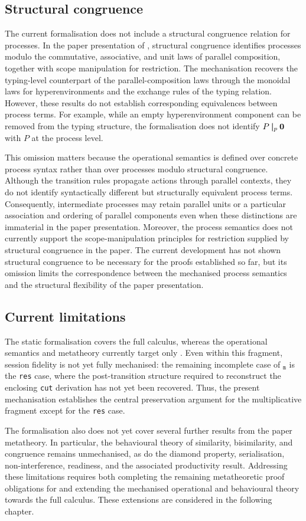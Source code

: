 \subsection{Structural congruence}
The current formalisation does not include a structural congruence relation for processes. In the paper presentation of \pill{}, structural congruence identifies processes modulo the commutative, associative, and unit laws of parallel composition, together with scope manipulation for restriction. The mechanisation recovers the typing-level counterpart of the parallel-composition laws through the monoidal laws for hyperenvironments and the exchange rules of the typing relation. However, these results do not establish corresponding equivalences between process terms. For example, while an empty hyperenvironment component can be removed from the typing structure, the formalisation does not identify $P \mathbin{\boldsymbol{|}}_p \mathbf{0}$ with $P$ at the process level.

This omission matters because the operational semantics is defined over concrete process syntax rather than over processes modulo structural congruence. Although the transition rules propagate actions through parallel contexts, they do not identify syntactically different but structurally equivalent process terms. Consequently, intermediate processes may retain parallel units or a particular association and ordering of parallel components even when these distinctions are immaterial in the paper presentation. Moreover, the process semantics does not currently support the scope-manipulation principles for restriction supplied by structural congruence in the paper. The current development has not shown structural congruence to be necessary for the proofs established so far, but its omission limits the correspondence between the mechanised process semantics and the structural flexibility of the paper presentation.

\subsection{Current limitations}
The static formalisation covers the full \pill{} calculus, whereas the operational semantics and metatheory currently target only \pimll{}. Even within this fragment, session fidelity is not yet fully mechanised: the remaining incomplete case of $_{\texttt{m}}$ is the \texttt{res} case, where the post-transition structure required to reconstruct the enclosing \texttt{cut} derivation has not yet been recovered. Thus, the present mechanisation establishes the central preservation argument for the multiplicative fragment except for the \texttt{res} case.

The formalisation also does not yet cover several further results from the paper metatheory. In particular, the behavioural theory of similarity, bisimilarity, and congruence remains unmechanised, as do the diamond property, serialisation, non-interference, readiness, and the associated productivity result. Addressing these limitations requires both completing the remaining metatheoretic proof obligations for \pimll{} and extending the mechanised operational and behavioural theory towards the full calculus. These extensions are considered in the following chapter.



